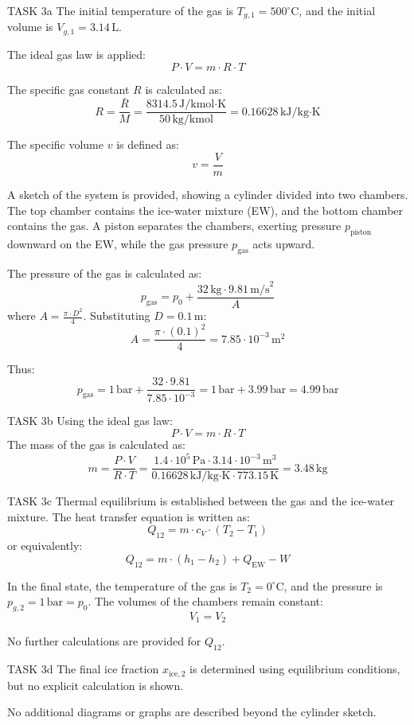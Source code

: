 TASK 3a  
The initial temperature of the gas is \( T_{g,1} = 500^\circ\text{C} \), and the initial volume is \( V_{g,1} = 3.14 \, \text{L} \).  

The ideal gas law is applied:  
\[
P \cdot V = m \cdot R \cdot T
\]  

The specific gas constant \( R \) is calculated as:  
\[
R = \frac{\bar{R}}{M} = \frac{8314.5 \, \text{J/kmol·K}}{50 \, \text{kg/kmol}} = 0.16628 \, \text{kJ/kg·K}
\]  

The specific volume \( v \) is defined as:  
\[
v = \frac{V}{m}
\]  

A sketch of the system is provided, showing a cylinder divided into two chambers. The top chamber contains the ice-water mixture (EW), and the bottom chamber contains the gas. A piston separates the chambers, exerting pressure \( p_{\text{piston}} \) downward on the EW, while the gas pressure \( p_{\text{gas}} \) acts upward.  

The pressure of the gas is calculated as:  
\[
p_{\text{gas}} = p_0 + \frac{32 \, \text{kg} \cdot 9.81 \, \text{m/s}^2}{A}
\]  
where \( A = \frac{\pi \cdot D^2}{4} \). Substituting \( D = 0.1 \, \text{m} \):  
\[
A = \frac{\pi \cdot (0.1)^2}{4} = 7.85 \cdot 10^{-3} \, \text{m}^2
\]  

Thus:  
\[
p_{\text{gas}} = 1 \, \text{bar} + \frac{32 \cdot 9.81}{7.85 \cdot 10^{-3}} = 1 \, \text{bar} + 3.99 \, \text{bar} = 4.99 \, \text{bar}
\]  

TASK 3b  
Using the ideal gas law:  
\[
P \cdot V = m \cdot R \cdot T
\]  
The mass of the gas is calculated as:  
\[
m = \frac{P \cdot V}{R \cdot T} = \frac{1.4 \cdot 10^5 \, \text{Pa} \cdot 3.14 \cdot 10^{-3} \, \text{m}^3}{0.16628 \, \text{kJ/kg·K} \cdot 773.15 \, \text{K}} = 3.48 \, \text{kg}
\]  

TASK 3c  
Thermal equilibrium is established between the gas and the ice-water mixture. The heat transfer equation is written as:  
\[
Q_{12} = m \cdot c_V \cdot (T_2 - T_1)
\]  
or equivalently:  
\[
Q_{12} = m \cdot (h_1 - h_2) + Q_{\text{EW}} - W
\]  

In the final state, the temperature of the gas is \( T_2 = 0^\circ\text{C} \), and the pressure is \( p_{g,2} = 1 \, \text{bar} = p_0 \). The volumes of the chambers remain constant:  
\[
V_1 = V_2
\]  

No further calculations are provided for \( Q_{12} \).  

TASK 3d  
The final ice fraction \( x_{\text{ice},2} \) is determined using equilibrium conditions, but no explicit calculation is shown.  

No additional diagrams or graphs are described beyond the cylinder sketch.